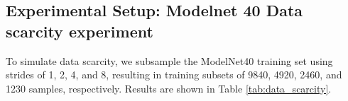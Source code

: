 \documentclass{article}
\newcommand{\nd}{\todo[color=blue!40]}
\theoremstyle{definition}
\theoremstyle{plain}
\begin{document}




\subsection{Experimental Setup: Modelnet 40 Data scarcity experiment}
To simulate data scarcity, we subsample the ModelNet40 training set using strides of 1, 2, 4, and 8, resulting in training subsets of 9840, 4920, 2460, and 1230 samples, respectively. Results are shown in Table  \ref{tab:data_scarcity}.
\end{document}
